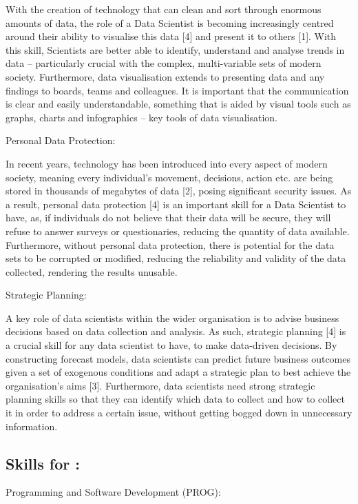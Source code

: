 \documentclass[a4paper, 11pt]{report}
\begin{document}
With the creation of technology that can clean and sort through enormous amounts of data, the role of a Data Scientist is becoming increasingly centred around their ability to visualise this data [4] and present it to others [1]. With this skill, Scientists are better able to identify, understand and analyse trends in data – particularly crucial with the complex, multi-variable sets of modern society. Furthermore, data visualisation extends to presenting data and any findings to boards, teams and colleagues. It is important that the communication is clear and easily understandable, something that is aided by visual tools such as graphs, charts and infographics – key tools of data visualisation.


Personal Data Protection:

In recent years, technology has been introduced into every aspect of modern society, meaning every individual’s movement, decisions, action etc. are being stored in thousands of megabytes of data [2], posing significant security issues. As a result, personal data protection [4] is an important skill for a Data Scientist to have, as, if individuals do not believe that their data will be secure, they will refuse to answer surveys or questionaries, reducing the quantity of data available. Furthermore, without personal data protection, there is potential for the data sets to be corrupted or modified, reducing the reliability and validity of the data collected, rendering the results unusable.


Strategic Planning:

A key role of data scientists within the wider organisation is to advise business decisions based on data collection and analysis. As such, strategic planning [4] is a crucial skill for any data scientist to have, to make data-driven decisions. By constructing forecast models, data scientists can predict future business outcomes given a set of exogenous conditions and adapt a strategic plan to best achieve the organisation’s aims [3]. Furthermore, data scientists need strong strategic planning skills so that they can identify which data to collect and how to collect it in order to address a certain issue, without getting bogged down in unnecessary information.

\subsection{Skills for \majC: \studC}

Programming and Software Development (PROG):
\end{document}

